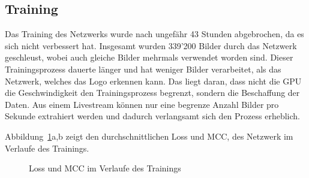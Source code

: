 \documentclass[12pt,a4paper]{report}
\begin{document}
\subsection{Training}
Das Training des Netzwerks wurde nach ungefähr 43 Stunden abgebrochen, da es sich nicht verbessert hat.
Insgesamt wurden 339'200 Bilder durch das Netzwerk geschleust, wobei auch gleiche Bilder mehrmals verwendet worden sind.
Dieser Trainingsprozess dauerte länger und hat weniger Bilder verarbeitet, als das Netzwerk, welches das Logo erkennen kann.
Das liegt daran, dass nicht die GPU die Geschwindigkeit den Trainingsprozess begrenzt, sondern die Beschaffung der Daten.
Aus einem Livestream können nur eine begrenze Anzahl Bilder pro Sekunde extrahiert werden und dadurch verlangsamt sich den Prozess erheblich.

Abbildung~\ref{fig:loss2}a,b zeigt den durchschnittlichen Loss und MCC,
des Netzwerk im Verlaufe des Trainings.
\begin{figure}[h]%
    \centering
    \qquad
    \caption{Loss und MCC im Verlaufe des Trainings}%
    \label{fig:loss2}%
\end{figure}
\end{document}
